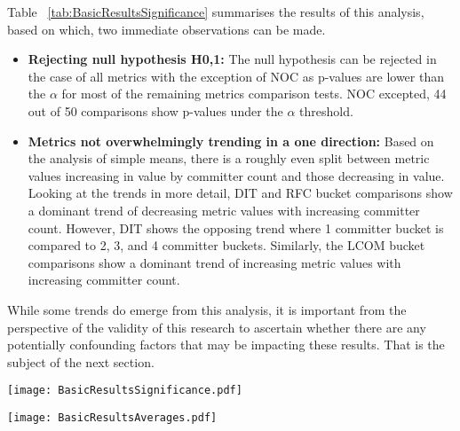 Table ~\ref{tab:BasicResultsSignificance} summarises the results of this analysis, based on which, two immediate observations can be made.

\begin{itemize}
\item  \textbf{Rejecting null hypothesis H0,1:} The null hypothesis can be rejected in the case of all metrics with the exception of NOC as p-values are lower than the  $\alpha$ for most of the remaining metrics comparison tests. NOC excepted, 44 out of 50 comparisons show p-values under the $\alpha$ threshold. 
\item  \textbf{Metrics not overwhelmingly trending in a one direction:} Based on the analysis of simple means, there is a roughly even split between metric values increasing in value by committer count and those decreasing in value. Looking at the trends in more detail, DIT and RFC bucket comparisons show a dominant trend of decreasing metric values with increasing committer count. However, DIT shows the opposing trend where 1 committer bucket is compared to 2, 3, and 4 committer buckets. Similarly, the LCOM bucket comparisons show a dominant trend of increasing metric values with increasing committer count.
\end{itemize}

While some trends do emerge from this analysis, it is important from the perspective of the validity of this research to ascertain whether there are any potentially confounding factors that may be impacting these results. That is the subject of the next section.

\begin{table}
\centering 
{}
\begin{tabular}
 \centering 
 \texttt{[image: BasicResultsSignificance.pdf]}
 \label{tab:BasicResultsSignificance}
\end{tabular}
\end{table}

\begin{table}
\centering 
{}
\begin{tabular}
 \centering 
 \texttt{[image: BasicResultsAverages.pdf]}
 \label{tab:BasicResultsAverages}
\end{tabular}
\end{table}


